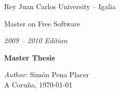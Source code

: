 \begin{titlepage}
\begin{center}

\Large{Rey Juan Carlos University -- Igalia}

Master on Free Software

\emph{\large{2009 -- 2010 Edition}}

\vspace*{3cm}

\textbf{\LARGE{Master Thesis}}

\end{center}

\vspace*{14cm}

\begin{flushright}
\large{
\emph{Author:} Sim\'on Pena Placer\\
A Coru\~na, \today}
\end{flushright}

\end{titlepage}
